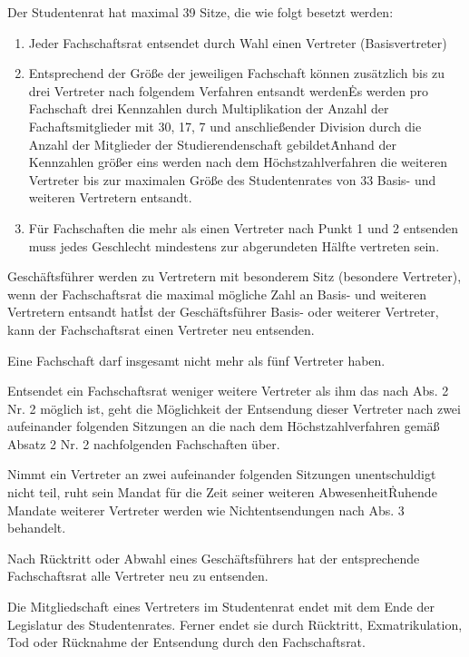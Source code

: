 \begin{multicols}{2}
\Abs \Satz Der Studentenrat hat maximal 39 Sitze, die wie folgt besetzt werden:
\begin{enumerate}
\item Jeder Fachschaftsrat entsendet durch Wahl einen Vertreter (Basisvertreter)
\item \Satz Entsprechend der Größe der jeweiligen Fachschaft können zusätzlich bis zu drei Vertreter nach folgendem Verfahren entsandt werden\. Es werden pro Fachschaft drei Kennzahlen durch Multiplikation der Anzahl der Fachaftsmitglieder mit 30, 17, 7 und anschließender Division durch die Anzahl der Mitglieder der Studierendenschaft gebildet\. Anhand der Kennzahlen größer eins werden nach dem Höchstzahlverfahren die weiteren Vertreter bis zur maximalen Größe des Studentenrates von 33 Basis- und weiteren Vertretern entsandt.
\item Für Fachschaften die mehr als einen Vertreter nach Punkt 1 und 2 entsenden muss jedes Geschlecht mindestens zur abgerundeten Hälfte vertreten sein.
\end{enumerate}

\Abs \Satz Geschäftsführer werden zu Vertretern mit besonderem Sitz (besondere Vertreter), wenn der Fachschaftsrat die maximal mögliche Zahl an Basis- und weiteren Vertretern entsandt hat\. Ist der Geschäftsführer Basis- oder weiterer Vertreter, kann der Fachschaftsrat einen Vertreter neu entsenden.

\Abs \Satz Eine Fachschaft darf insgesamt nicht mehr als fünf Vertreter haben.

\Abs \Satz Entsendet ein Fachschaftsrat weniger weitere Vertreter als ihm das nach Abs. 2 Nr. 2 möglich ist, geht die Möglichkeit der Entsendung dieser Vertreter nach zwei aufeinander folgenden Sitzungen an die nach dem Höchstzahlverfahren gemäß Absatz 2 Nr. 2 nachfolgenden Fachschaften über.

\Abs \Satz Nimmt ein Vertreter an zwei aufeinander folgenden Sitzungen unentschuldigt nicht teil, ruht sein Mandat für die Zeit seiner weiteren Abwesenheit\. Ruhende Mandate weiterer Vertreter werden wie Nichtentsendungen nach Abs. 3 behandelt.

\Abs \Satz Nach Rücktritt oder Abwahl eines Geschäftsführers hat der entsprechende Fachschaftsrat alle Vertreter neu zu entsenden.

\Abs \Satz Die Mitgliedschaft eines Vertreters im Studentenrat endet mit dem Ende der Legislatur des Studentenrates. Ferner endet sie durch Rücktritt, Exmatrikulation, Tod oder Rücknahme der Entsendung durch den Fachschaftsrat.


\end{multicols}
